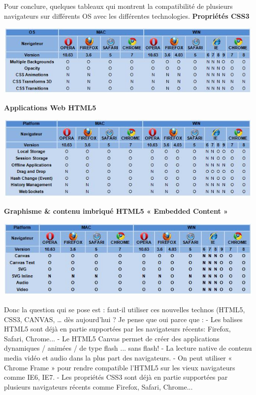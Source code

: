 \documentclass[a4paper,10pt]{report}
\begin{document}
Pour conclure, quelques tableaux qui montrent la compatibilité de plusieurs navigateurs sur différents OS avec les différentes technologies.
\textbf{Propriétés CSS3}
\begin{center}
 \includegraphics[bb=0 0 491 131]{img/CSS-Prop.jpg}
\end{center}
\textbf{Applications Web HTML5}
\begin{center}
 \includegraphics[bb=0 0 491 131]{img/HTML5-WebApp.jpg}
\end{center}
\textbf{Graphisme & contenu imbriqué HTML5  « Embedded Content »}
\begin{center}
 \includegraphics[bb=0 0 491 131]{img/Graphics.jpg}
\end{center}

Donc la question qui se pose est : faut-il utiliser ces nouvelles technos (HTML5, CSS3, CANVAS, … dès aujourd'hui ?
Je pense que oui parce que :
-       Les balises HTML5 sont déjà en partie supportées par les navigateurs récents: Firefox, Safari, Chrome...
-       Le HTML5 Canvas permet de créer des applications dynamiques / animées / de type flash ... sans flash!
-       La lecture native de contenu media vidéo et audio dans la plus part des navigateurs.
-       On peut utiliser « Chrome Frame » pour rendre compatible l'HTML5 sur les vieux navigateurs comme IE6, IE7.
-       Les propriétés CSS3 sont déjà en partie supportées par plusieurs navigateurs récents comme Firefox, Safari, Chrome...
\end{document}
